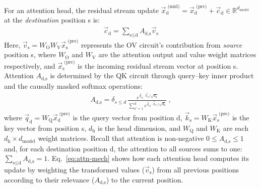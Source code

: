 \documentclass{article}
\theoremstyle{plain}
\theoremstyle{definition}
\theoremstyle{remark}
\begin{document}
For an attention head, the residual stream update %
$\vec{x}_\text{d}^\text{ (mid)} = \vec{x}_\text{d}^{\text{ (pre)}} + \vec{c}_\text{d}  \in \mathbb{R}^{d_\text{model}}$ 
at the \emph{destination} position s is:
\begin{align}
\label{eq:attn-mech}
\vec{c}_\text{d} = \sum_{\text{s} \le \text{d}} A_{\text{d}, \text{s}} \vec{v}_\text{s}
\end{align}
Here, $\vec{v}_\text{s} = W_\text{O} W_\text{V} \vec{x}_\text{s}^\text{ (pre)}$ represents the OV circuit's 
contribution from
\emph{source} position s, 
where $W_\text{O}$ and $W_\text{V}$ are the attention output and value weight matrices respectively, and $\vec{x}_\text{s}^{\text{ (pre)}}$ is the incoming residual stream vector at position s. 
Attention $A_{\text{d},\text{s}}$ is determined by the QK circuit through query--key 
inner product
and the causally masked softmax operations:
\begin{align}
\label{eq:attn-def}
A_{\text{d}, \text{s}}  =  \delta_{s \leq d} \, \frac{ e^{ \vec{q}_\text{d} \cdot \vec{k}_\text{s} / \sqrt{d_\text{h}} }}{  \sum_{\text{s}' =1}^\text{d}   e^{ \vec{q}_\text{d} \cdot \vec{k}_{\text{s}'} / \sqrt{d_\text{h}} }} ~,
\end{align}
where 
$\vec{q}_\text{d} = W_\text{Q} \vec{x}_\text{d}^\text{ (pre)}$ 
is the query vector from position d,
$\vec{k}_\text{s} = W_\text{K}  \vec{x}_{\text{s}}^\text{ (pre)}$ is the key vector from position s,
$d_\text{h}$ is the head dimension, and 
$W_\text{Q}$ and $W_\text{K}$ are each $d_\text{h} \times d_\text{model}$ weight matrices.
%
Recall that attention is non-negative $0 \leq A_{\text{d}, \text{s}} \leq 1$
and, for each destination position d, the attention to all sources sums to one: 
$\sum_{\text{s} \leq \text{d}} A_{\text{d}, \text{s}} =1$.
Eq.~\eqref{eq:attn-mech}
shows how each attention head computes its update by weighting the transformed values ($\vec{v}_\text{s}$) from all previous positions according to their relevance ($A_{\text{d}, \text{s}}$) to the current position.

\end{document}
